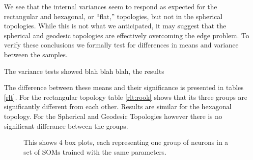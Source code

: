 We see that the internal variances seem to respond as expected for the
rectangular and hexagonal, or ``flat,''  topologies, but not in the spherical
topologies.  While this is not what we anticipated, it may suggest that the
spherical and geodesic topologies are effectively overcoming the edge problem.
To verify these conclusions we formally test for differences in means and
variance between the samples. 


The variance tests showed blah blah blah, the
results


The difference between these means
and their significance is presented in tables \ref{rlt}.  For the rectangular
topology table \ref{rlt:rook} shows that its three groups are significantly
different from each other. Results are similar for the hexagonal topology. For
the Spherical and Geodesic Topologies however there is no significant
differance between the groups.

\begin{figure}[hbt]
\centering
{}
\caption{This shows 4 box plots, each representing one group of neurons in a set
of SOMs trained with the same parameters.}
\label{boxplot}
\end{figure}



